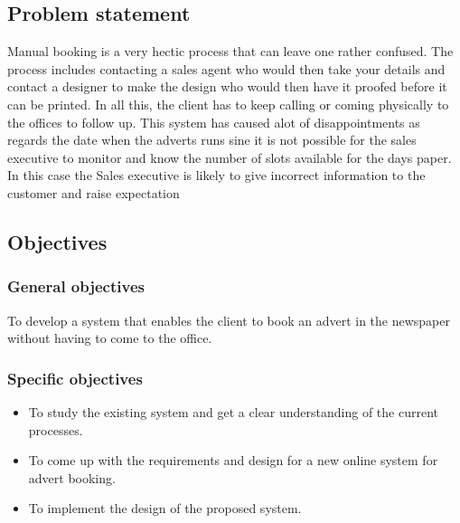 \documentclass[12pt]{article}
\begin{document}
\subsection{Problem statement}
Manual booking is a very hectic process that can leave one rather confused. The process includes contacting a sales agent who would then take your details and contact a designer to make the design who would then have it proofed before it can be printed. In all this, the client has to keep calling or coming physically to the offices to follow up. This system has caused alot of disappointments as regards the date when the adverts runs sine it is not possible for the sales executive to monitor and know the number of slots available for the days paper. In this case the Sales executive is likely to give incorrect information to the customer and raise expectation
\subsection{Objectives}
\subsubsection{General objectives}
To develop a system that enables the client to book an advert in the newspaper without having to come to the office.
\subsubsection{Specific objectives}
\begin{itemize}
\item To study the existing system and get a clear understanding of the current processes.
\item To come up with the requirements and design for a new online system for advert booking.
\item To implement the design of the proposed system.
\end{itemize}
\end{document}
